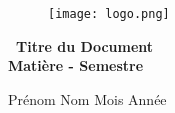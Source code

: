 \documentclass[a4paper,fleqn]{article}
\begin{document}




\thispagestyle{empty}

\begin{figure}
    \centering
    \texttt{[image: logo.png]}
\end{figure}

\vspace{6cm}	

\begin{center}	
    {\huge \bf\ Titre du Document  \\
    \vspace{4cm}
    \large Matière - Semestre \\

    \vspace{0.5cm}

    Prénom Nom
    \vfill	
    Mois Année 
    \pagebreak}
\end{center}




\end{document}

